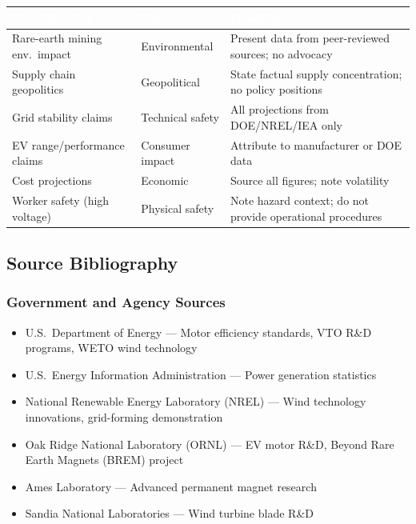 \documentclass[11pt,letterpaper]{article}
\newcommand{\tableheader}[1]{\textbf{\sffamily\textcolor{white}{#1}}}
\begin{document}
\begin{center}
\begin{tabularx}{\textwidth}{L{4cm}C{2cm}X}
\toprule
{}
\tableheader{Consideration} & \tableheader{Type} & \tableheader{Handling} \\
\midrule
Rare-earth mining env.\ impact & Environmental & Present data from peer-reviewed sources; no advocacy \\
Supply chain geopolitics & Geopolitical & State factual supply concentration; no policy positions \\
Grid stability claims & Technical safety & All projections from DOE/NREL/IEA only \\
EV range/performance claims & Consumer impact & Attribute to manufacturer or DOE data \\
Cost projections & Economic & Source all figures; note volatility \\
Worker safety (high voltage) & Physical safety & Note hazard context; do not provide operational procedures \\
\bottomrule
\end{tabularx}
\end{center}

\subsection{Source Bibliography}

\subsubsection{Government and Agency Sources}
\begin{itemize}[leftmargin=2em]
\item U.S.\ Department of Energy --- Motor efficiency standards, VTO R\&D programs, WETO wind technology
\item U.S.\ Energy Information Administration --- Power generation statistics
\item National Renewable Energy Laboratory (NREL) --- Wind technology innovations, grid-forming demonstration
\item Oak Ridge National Laboratory (ORNL) --- EV motor R\&D, Beyond Rare Earth Magnets (BREM) project
\item Ames Laboratory --- Advanced permanent magnet research
\item Sandia National Laboratories --- Wind turbine blade R\&D
\end{itemize}
\end{document}
